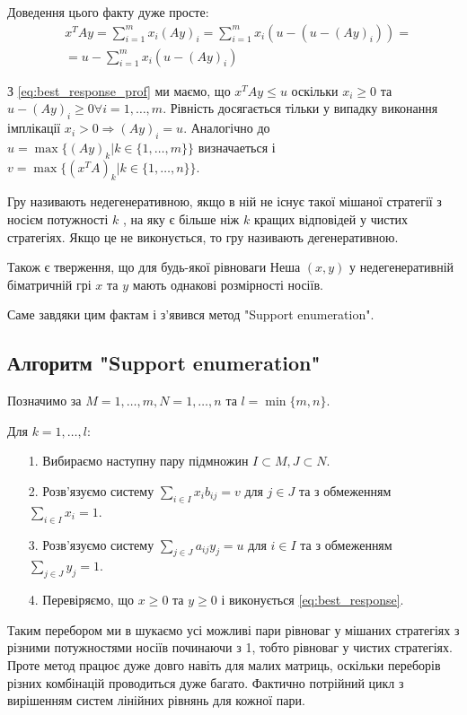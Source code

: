 Доведення цього факту дуже просте:
\begin{equation}
	\begin{aligned}
		&x^TAy = \sum_{i=1}^{m}x_i(Ay)_i = \sum_{i=1}^{m}x_i(u - (u - (Ay)_i)) =\\
		&= u - \sum_{i=1}^{m}x_i(u - (Ay)_i)
	\end{aligned}
	\label{eq:best_response_prof}
\end{equation}

З \ref{eq:best_response_prof} ми маємо, що $x^TAy \le u$ оскільки $x_i \ge 0$ та $u-(Ay)_i \ge 0 \forall i = {1,\ldots,m}$. Рівність досягається тільки у випадку виконання імплікації $x_i > 0 \Rightarrow (Ay)_i = u$. Аналогічно до $u = \max\{(Ay)_k | k \in \{1,\ldots,m\} \}$ визначаеться і $v = \max\{(x^TA)_k | k \in \{1,\ldots,n\} \}$.

Гру називають недегенеративною, якщо в ній не існує такої мішаної стратегії з носієм потужності $k$ , на яку є більше ніж $k$ кращих відповідей у чистих стратегіях. Якщо це не виконується, то гру називають дегенеративною.

Також є тверження, що для будь-якої рівноваги Неша $(x,y)$ у недегенеративній біматричній грі $x$ та $y$ мають однакові розмірності носіїв.

Саме завдяки цим фактам і з'явився метод "Support enumeration".

\subsection{Алгоритм "Support enumeration"}

Позначимо за $M={1,\ldots,m}, N={1,\ldots,n}$ та $l=\min\{m,n\}$.

Для $k=1,\ldots,l$:
\begin{itemize}
	\item[1.] Вибираємо наступну пару підмножин $I \subset M, J \subset N$.
	\item[2.] Розв'язуємо систему $\sum_{i \in I}x_ib_{ij}=v$ для $j \in J$ та з обмеженням $\sum_{i \in I}x_i = 1$.
	\item[3.] Розв'язуємо систему $\sum_{j \in J}a_{ij}y_j=u$ для $i \in I$ та з обмеженням $\sum_{j \in J}y_j = 1$.
	\item[4.] Перевіряємо, що $x \ge 0$ та $y \ge 0$ і виконується \ref{eq:best_response}.
\end{itemize}

Таким перебором ми в шукаємо усі можливі пари рівноваг у мішаних стратегіях з різними потужностями носіїв починаючи з 1, тобто рівноваг у чистих стратегіях. Проте метод працює дуже довго навіть для малих матриць, оскільки переборів різних комбінацій проводиться дуже багато. Фактично потрійний цикл з вирішенням систем лінійних рівнянь для кожної пари.

